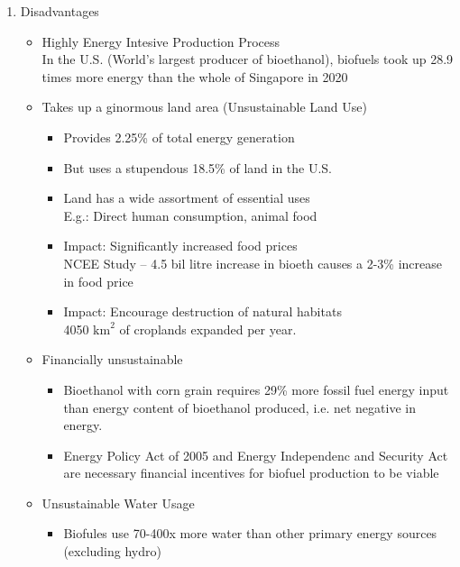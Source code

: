 \documentclass[oneside]{book}
\begin{document}
\begin{enumerate}
\begin{enumerate}
\begin{enumerate}
\begin{itemize}
            \end{itemize}
            \item Disadvantages \begin{itemize}
                \item Highly Energy Intesive Production Process\\[2mm] In the U.S. (World's largest producer of bioethanol), biofuels took up 28.9 times more energy than the whole of Singapore in 2020
                \item Takes up a ginormous land area (Unsustainable Land Use)\\[2mm]
                \begin{itemize}
                    \item Provides 2.25\% of total energy generation
                    \item But uses a stupendous 18.5\% of land in the U.S.
                    \item Land has a wide assortment of essential uses\\[2mm]
                    E.g.: Direct human consumption, animal food
                    \item Impact: Significantly increased food prices\\[2mm]
                    NCEE Study – 4.5 bil litre increase in bioeth causes a 2-3\% increase in food price
                    \item Impact: Encourage destruction of natural habitats\\[2mm]
                    4050 \(\text{km}^2\) of croplands expanded per year.
                \end{itemize}
                \item Financially unsustainable \begin{itemize}
                    \item Bioethanol with corn grain requires 29\% more fossil fuel energy input than energy content of bioethanol produced, i.e. net negative in energy.
                    \item Energy Policy Act of 2005 and Energy Independenc and Security Act are necessary financial incentives for biofuel production to be viable
                \end{itemize}
                \item Unsustainable Water Usage \begin{itemize}
                    \item Biofules use 70-400x more water than other primary energy sources (excluding hydro)

\end{itemize}
\end{itemize}
\end{enumerate}
\end{enumerate}
\end{enumerate}
\end{document}
